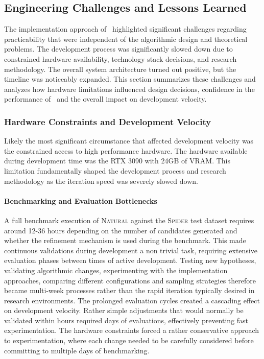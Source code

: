 \subsection{Engineering Challenges and Lessons Learned}

The implementation approach of \Natural~highlighted significant challenges
regarding practicability that were independent of the algorithmic design and
theoretical problems. The development process was significantly slowed down due
to constrained hardware availability, technology stack decisions, and research
methodology. The overall system architecture turned out positive, but the
timeline was noticeably expanded. This section summarizes these challenges and
analyzes how hardware limitations influenced design decisions, confidence in
the performance of \Natural~and the overall impact on development velocity.

\subsubsection{Hardware Constraints and Development Velocity}

Likely the most significant circumstance that affected development velocity was
the constrained access to high performance hardware. The hardware available
during development time was the RTX 3090 with 24GB of VRAM. This limitation
fundamentally shaped the development process and research methodology as the
iteration speed was severely slowed down.

\paragraph{Benchmarking and Evaluation Bottlenecks}

A full benchmark execution of \textsc{Natural} against the \textsc{Spider} test
dataset requires around 12-36 hours depending on the number of
candidates generated and whether the refinement mechanism is used during the
benchmark. This made continuous validations during development a non trivial
task, requiring extensive evaluation phases between times of active
development. Testing new hypotheses, validating algorithmic changes,
experimenting with the implementation approaches, comparing different
configurations and sampling strategies therefore became multi-week processes
rather than the rapid iteration typically desired in research environments. The
prolonged evaluation cycles created a cascading effect on development velocity.
Rather simple adjustments that would normally be validated within hours
required days of evaluations, effectively preventing fast experimentation. The
hardware constraints forced a rather conservative approach to experimentation,
where each change needed to be carefully considered before committing to
multiple days of benchmarking.

